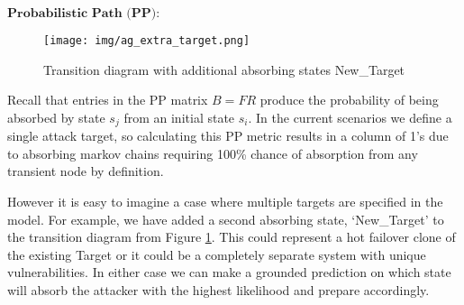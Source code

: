 
\(
\textbf{Probabilistic Path (PP):} 
\)


\begin{figure}[ht]
\centering
\texttt{[image: img/ag\_extra\_target.png]}
\caption{Transition diagram with additional absorbing states New\_Target}
\label{fig:ag_pp}
\end{figure}


Recall that entries in the PP matrix \(B = FR\) produce the probability of being absorbed by state \(s_j\) from an initial state \(s_i\).  In the current scenarios we define a single attack target, so calculating this PP metric results in a column of 1’s due to absorbing markov chains requiring 100\% chance of absorption from any transient node by definition.   

However it is easy to imagine a case where multiple targets are specified in the model. For example, we have added a second absorbing state, ‘New\_Target’ to the transition diagram from Figure \ref{fig:ag_pp}. This could represent a hot failover clone of the existing Target or it could be a completely separate system with unique vulnerabilities. In either case we can make a grounded prediction on which state will absorb the attacker with the highest likelihood and prepare accordingly. 


